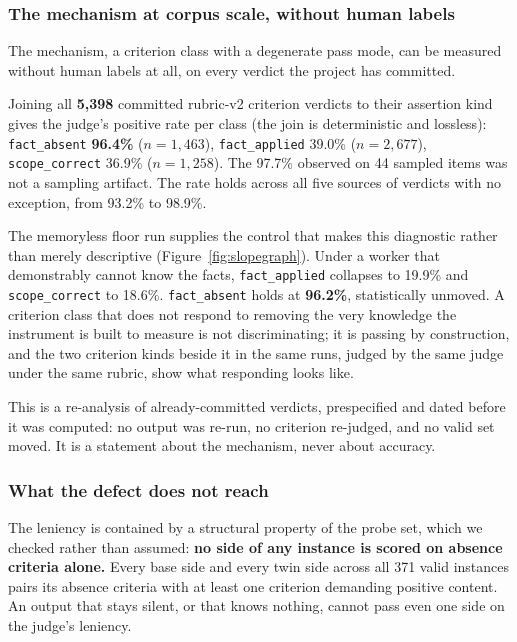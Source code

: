 \documentclass[11pt]{article}
\newcommand{\code}[1]{\texttt{\small #1}}
\begin{document}
\subsubsection*{The mechanism at corpus scale, without human labels}

The mechanism, a criterion class with a degenerate pass mode, can be measured
without human labels at all, on every verdict the project has committed.

Joining all \textbf{5{,}398} committed rubric-v2 criterion verdicts to their
assertion kind gives the judge's positive rate per class (the join is
deterministic and lossless): \code{fact\_absent} \textbf{96.4\%} ($n = 1{,}463$),
\code{fact\_applied} 39.0\% ($n = 2{,}677$), \code{scope\_correct} 36.9\% ($n =
1{,}258$). The 97.7\% observed on 44 sampled items was not a sampling artifact.
The rate holds across all five sources of verdicts with no exception, from 93.2\%
to 98.9\%.

The memoryless floor run supplies the control that makes this diagnostic rather
than merely descriptive (Figure~\ref{fig:slopegraph}). Under a worker that
demonstrably cannot know the facts, \code{fact\_applied} collapses to 19.9\% and
\code{scope\_correct} to 18.6\%. \code{fact\_absent} holds at \textbf{96.2\%},
statistically unmoved. A criterion class that does not respond to removing the
very knowledge the instrument is built to measure is not discriminating; it is
passing by construction, and the two criterion kinds beside it in the same runs,
judged by the same judge under the same rubric, show what responding looks like.

This is a re-analysis of already-committed verdicts, prespecified and dated
before it was computed: no output was re-run, no criterion re-judged, and no
valid set moved. It is a statement about the mechanism, never about accuracy.

\subsubsection*{What the defect does not reach}

The leniency is contained by a structural property of the probe set, which we
checked rather than assumed: \textbf{no side of any instance is scored on absence
criteria alone.} Every base side and every twin side across all 371 valid
instances pairs its absence criteria with at least one criterion demanding
positive content. An output that stays silent, or that knows nothing, cannot pass
even one side on the judge's leniency.
\end{document}
